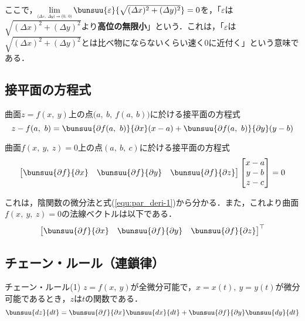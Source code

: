 ここで，$\dlim_{\scalebox{0.5}{$(\varDelta x,\ \varDelta y) \to (0,\ 0)$}} \bunsuu{\varepsilon}{\sqrt{(\varDelta x)^2 + (\varDelta y)^2}} = 0$を，「$\varepsilon$は$\sqrt{(\varDelta x)^2 + (\varDelta y)^2}$より\textbf{高位の無限小}」という．これは，「$\varepsilon$は$\sqrt{(\varDelta x)^2 + (\varDelta y)^2}$とは比べ物にならないくらい速く$0$に近付く」という意味である．



\subsection{接平面の方程式}

曲面$z = f(x,\ y)$上の点$\bigl(a,\ b,\ f(a,\ b)\bigr)$に於ける接平面の方程式
\begin{equation}
	z - f(a,\ b) = \bunsuu{\partial f(a,\ b)}{\partial x}(x - a) + \bunsuu{\partial f(a,\ b)}{\partial y}(y - b) \label{equ:par_deri-1}
\end{equation}

曲面$f(x,\ y,\ z) = 0$上の点$(a,\ b,\ c)$に於ける接平面の方程式
\begin{equation}
	\begin{bmatrix}
		\bunsuu{\partial f}{\partial x} & \bunsuu{\partial f}{\partial y} & \bunsuu{\partial f}{\partial z} 
	\end{bmatrix}
	\begin{bmatrix}
		x - a\\ y - b\\ z - c
	\end{bmatrix}
	= 0
\end{equation}

これは，陰関数の微分法と式(\ref{equ:par_deri-1})から分かる．また，これより曲面$f(x,\ y,\ z) = 0$の法線ベクトルは以下である．
\begin{equation}
	{
		\begin{bmatrix}
			\bunsuu{\partial f}{\partial x} & \bunsuu{\partial f}{\partial y} & \bunsuu{\partial f}{\partial z}
		\end{bmatrix}
	}^\top
\end{equation}



\subsection{チェーン・ルール（連鎖律）}

\begin{kousiki}{チェーン・ルール(1)}
	$z = f(x,\ y)$が全微分可能で，$x = x(t),\ y = y(t)$が微分可能であるとき，$z$は$t$の関数である．
	\begin{equation}
		\bunsuu{dz}{dt} = \bunsuu{\partial f}{\partial x}\bunsuu{dx}{dt} + \bunsuu{\partial f}{\partial y}\bunsuu{dy}{dt}
	\end{equation}
\end{kousiki}

